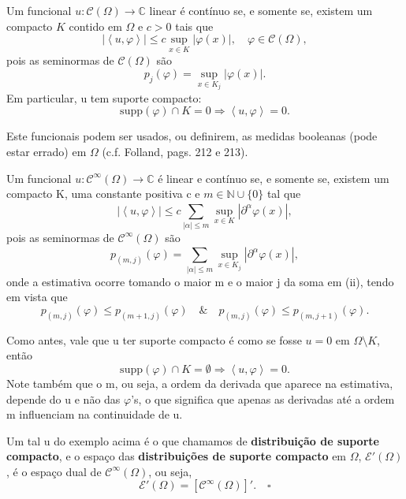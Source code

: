 \documentclass[../distribution_theory_notes.tex]{subfiles}
\begin{document}
  \begin{example}
   Um funcional \(u:\mathcal{C}(\Omega )\rightarrow \mathbb{C}\) linear é contínuo se, e somente se, existem um compacto \(K\) contido em \(\Omega \) e \(c > 0\) tais que 
     \[
       |\left< u, \varphi  \right>|\leq c \sup_{x\in K}|\varphi(x)|, \quad \varphi \in \mathcal{C}(\Omega ),
     \]
     pois as seminormas de \(\mathcal{C}(\Omega )\) são 
       \[
         p_{j}(\varphi )=\sup_{x\in K_{j}}|\varphi(x)|.
       \]
       Em particular, u tem suporte compacto:
         \[
           \mathrm{supp}(\varphi )\cap K= 0 \Rightarrow \left< u, \varphi  \right>=0.
         \]

         Este funcionais podem ser usados, ou definirem, as medidas booleanas (pode estar errado) em \(\Omega \) (c.f. Folland, pags. 212 e 213).
 \end{example}
 \begin{example}
   Um funcional \(u:\mathcal{C}^{\infty}(\Omega )\rightarrow \mathbb{C}\) é linear e contínuo se, e somente se, existem um compacto K, uma constante positiva c e \(m\in \mathbb{N}\cup \{0\}\) tal que 
     \[
       |\left< u, \varphi  \right>| \leq c \sum\limits_{|\alpha |\leq m}^{}\sup_{x\in K}|\partial^{\alpha }\varphi (x)|,
     \]
     pois as seminormas de \(\mathcal{C}^{\infty}(\Omega )\) são 
       \[
         p_{(m, j)}(\varphi ) = \sum\limits_{|\alpha |\leq m}^{} \sup_{x\in K_{j}}|\partial ^{\alpha }\varphi(x)|,
      \]
      onde a estimativa ocorre tomando o maior m e o maior j da soma em (ii), tendo em vista que 
        \[
          p_{(m, j)}(\varphi )\leq p_{(m+1, j)}(\varphi )\quad\&\quad p_{(m, j)}(\varphi )\leq p_{(m, j+1)}(\varphi ).
        \] 

        Como antes, vale que u ter suporte compacto é como se fosse \(u=0\) em \(\Omega \setminus{K}\), então
      \[
      \mathrm{supp}(\varphi )\cap K=\emptyset \Rightarrow \left< u, \varphi  \right>=0.
    \] 
    Note também que o m, ou seja, a ordem da derivada que aparece na estimativa, depende do u e não das \(\varphi \)'s, o que significa que apenas as derivadas até a ordem m influenciam na continuidade de u.
\end{example}
 \begin{def*}
   Um tal u do exemplo acima é o que chamamos de \textbf{distribuição de suporte compacto}, e o espaço das \textbf{distribuições de suporte compacto} em \(\Omega \), \(\mathcal{E}'(\Omega )\), é o espaço dual de \(\mathcal{C}^{\infty}(\Omega )\), ou seja, 
     \[
      \mathcal{E}'(\Omega )=[\mathcal{C}^{\infty}(\Omega )]'. \quad \square
     \]
 \end{def*}
\end{document}
